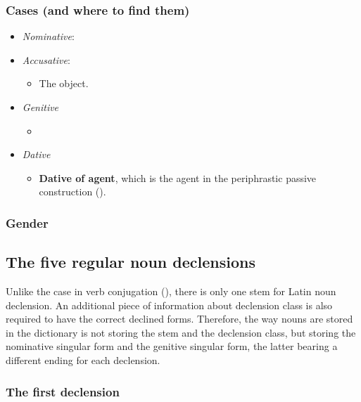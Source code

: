 \documentclass{article}
\newcommand*{\concept}[1]{\textbf{#1}}
\begin{document}
\subsubsection{Cases (and where to find them)}\label{sec:case}

\begin{itemize}
    \item \emph{Nominative}: %
    \item \emph{Accusative}: 
    \begin{itemize}
        \item The object.
    \end{itemize}
    \item \emph{Genitive}
    \begin{itemize}
        \item 
    \end{itemize}
    \item \emph{Dative}
    \begin{itemize}
        \item \concept{Dative of agent}, which is the agent in the periphrastic passive construction 
        (). 
    \end{itemize}
\end{itemize}

\subsubsection{Gender}



\subsection{The five regular noun declensions}\label{sec:regular-noun-declension}

Unlike the case in verb conjugation (), 
there is only one stem for Latin noun declension.
An additional piece of information about declension class 
is also required to have the correct declined forms.
Therefore, the way nouns are stored in the dictionary is not storing the stem and the declension class,
but storing the nominative singular form and the genitive singular form,
the latter bearing a different ending for each declension.

\subsubsection{The first declension}
\end{document}
